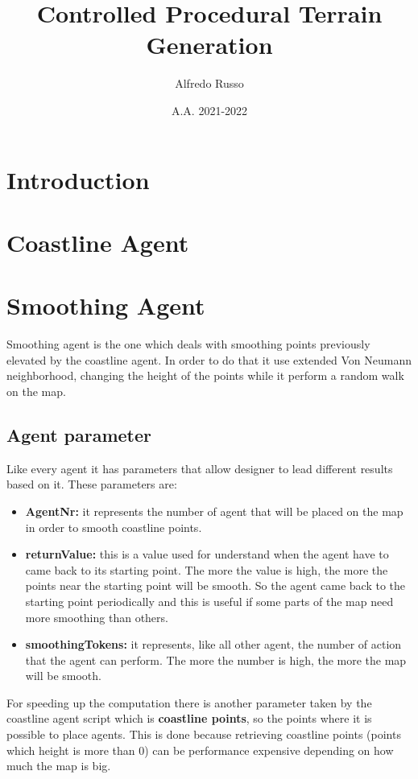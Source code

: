 \documentclass[12pt]{article}
\title{Controlled Procedural Terrain Generation}
\author{Alfredo Russo}
\date{A.A. 2021-2022}
\begin{document}
    \maketitle
    \newpage
    \tableofcontents
    \newpage
    

    \section{Introduction}

    \section{Coastline Agent}

    \section{Smoothing Agent}
    Smoothing agent is the one which deals with smoothing points previously elevated by the coastline agent.
    In order to do that it use extended Von Neumann neighborhood, changing the height of the points while it perform a random walk 
    on the map.
    
    \subsection{Agent parameter}
    Like every agent it has parameters that allow designer to lead different results based on it.
    These parameters are:
    \begin{itemize}
        \item \textbf{AgentNr:} it represents the number of agent that will be placed on the map in order to smooth coastline points.
        \item \textbf{returnValue:} this is a value used for understand when the agent have to came back to its starting point. The more the value is high, the more
        the points near the starting point will be smooth. So the agent came back to the starting point periodically and this is useful if some parts of the map need 
        more smoothing than others.
        \item \textbf{smoothingTokens:} it represents, like all other agent, the number of action that the agent can perform. The more the number is high, the more the map will be smooth.
    \end{itemize}

    For speeding up the computation there is another parameter taken by the coastline agent script which is \textbf{coastline points}, so the points where it is possible to place agents.
    This is done because retrieving coastline points (points which height is more than 0) can be performance expensive depending on how much the map is big. 
\end{document}
